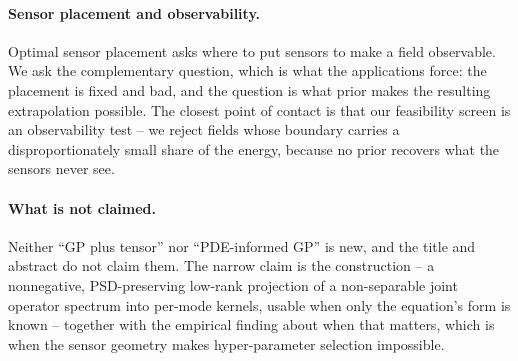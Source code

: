 \paragraph{Sensor placement and observability.}
Optimal sensor placement asks where to put sensors to make a field observable.
We ask the complementary question, which is what the applications force: the
placement is fixed and bad, and the question is what prior makes the resulting
extrapolation possible.  The closest point of contact is that our feasibility
screen is an observability test -- we reject fields whose boundary carries a
disproportionately small share of the energy, because no prior recovers what the
sensors never see.

\paragraph{What is not claimed.}
Neither ``GP plus tensor'' nor ``PDE-informed GP'' is new, and the title and
abstract do not claim them.  The narrow claim is the construction -- a
nonnegative, PSD-preserving low-rank projection of a non-separable joint
operator spectrum into per-mode kernels, usable when only the equation's form is
known -- together with the empirical finding about when that matters, which is
when the sensor geometry makes hyper-parameter selection impossible.
